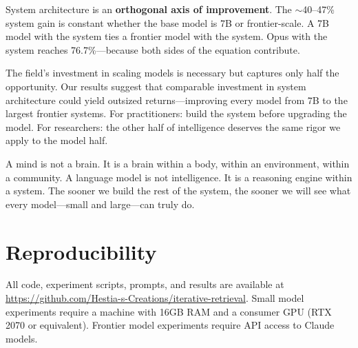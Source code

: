 \documentclass[11pt]{article}
\begin{document}
System architecture is an \textbf{orthogonal axis of improvement}. The $\sim$40--47\% system gain is constant whether the base model is 7B or frontier-scale. A 7B model with the system ties a frontier model with the system. Opus with the system reaches 76.7\%---because both sides of the equation contribute.

The field's investment in scaling models is necessary but captures only half the opportunity. Our results suggest that comparable investment in system architecture could yield outsized returns---improving every model from 7B to the largest frontier systems. For practitioners: build the system before upgrading the model. For researchers: the other half of intelligence deserves the same rigor we apply to the model half.

A mind is not a brain. It is a brain within a body, within an environment, within a community. A language model is not intelligence. It is a reasoning engine within a system. The sooner we build the rest of the system, the sooner we will see what every model---small and large---can truly do.

\section*{Reproducibility}

All code, experiment scripts, prompts, and results are available at \url{https://github.com/Hestia-s-Creations/iterative-retrieval}. Small model experiments require a machine with 16GB RAM and a consumer GPU (RTX 2070 or equivalent). Frontier model experiments require API access to Claude models.


\end{document}
